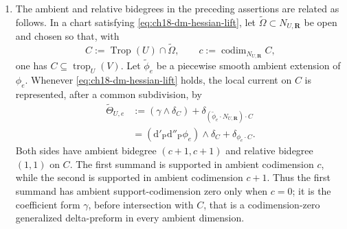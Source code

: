 \begin{lemma}
\begin{enumerate}
\item\label{itm:ch18-dm:degree}
 The ambient and relative bidegrees in the preceding assertions are related
 as follows.  In a chart satisfying \eqref{eq:ch18-dm-hessian-lift}, let
 \(\widetilde\Omega\subset N_{U,\mathbf R}\) be open and chosen so that,
 with
 \[
       C:=\operatorname{Trop}(U)\cap\widetilde\Omega,
       \qquad c:=\operatorname{codim}_{N_{U,\mathbf R}} C,
 \]
 one has \(C\subseteq\operatorname{trop}_U(V)\).  Let
 \(\widetilde\phi_e\) be a piecewise smooth ambient extension of
 \(\phi_e\).  Whenever \eqref{eq:ch18-dm-hessian-lift} holds, the local
 current on \(C\) is represented, after a common subdivision, by
 \begin{equation}
 \label{eq:ch18-dm-ambient-representative}
 \begin{aligned}
   \widetilde\Theta_{U,e}
    &:=(\gamma\wedge\delta_C)
       +\delta_{(\widetilde\phi_e\cdot N_{U,\mathbf R})\cdot C}\\
     &=(\mathrm d'_{\mathrm P}\mathrm d''_{\mathrm P}\phi_e)
          \wedge\delta_C
       +\delta_{\phi_e\cdot C}.
 \end{aligned}
 \end{equation}
 Both sides have ambient bidegree \((c+1,c+1)\) and relative bidegree
 \((1,1)\) on \(C\).  The first summand is supported in ambient codimension
 \(c\), while the second is supported in ambient codimension \(c+1\).
 Thus the first summand has ambient support-codimension zero only when
 \(c=0\); it is the coefficient form \(\gamma\), before intersection with
 \(C\), that is a codimension-zero generalized delta-preform in every
 ambient dimension.
\end{enumerate}
\end{lemma}
